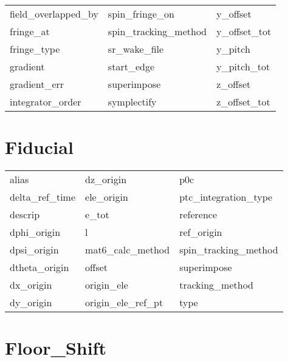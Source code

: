 \begin{tabular}{lll}
field_overlapped_by         & spin_fringe_on              & y_offset                    \\
fringe_at                   & spin_tracking_method        & y_offset_tot                \\
fringe_type                 & sr_wake_file                & y_pitch                     \\
gradient                    & start_edge                  & y_pitch_tot                 \\
gradient_err                & superimpose                 & z_offset                    \\
integrator_order            & symplectify                 & z_offset_tot                \\
 \bottomrule
 \end{tabular}
 \vfill
 
 \section{Fiducial}
 \label{s:list.fiducial}
 
 \begin{tabular}{lll} \toprule
alias                       & dz_origin                   & p0c                         \\
delta_ref_time              & ele_origin                  & ptc_integration_type        \\
descrip                     & e_tot                       & reference                   \\
dphi_origin                 & l                           & ref_origin                  \\
dpsi_origin                 & mat6_calc_method            & spin_tracking_method        \\
dtheta_origin               & offset                      & superimpose                 \\
dx_origin                   & origin_ele                  & tracking_method             \\
dy_origin                   & origin_ele_ref_pt           & type                        \\
 \bottomrule
 \end{tabular}
 \vfill
 
 \section{Floor_Shift}
 \label{s:list.floor.shift}
 
